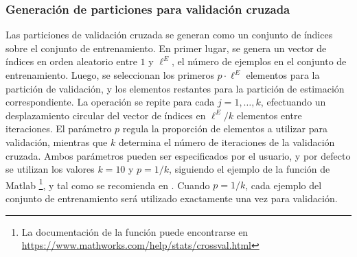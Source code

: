 %
%
\subsubsection{Generación de particiones para validación cruzada}
%
Las particiones de validación cruzada se generan como un conjunto de
índices sobre el conjunto de entrenamiento.
En primer lugar, se genera un vector de índices en orden aleatorio
entre $1$ y $\ell^E$, el número de ejemplos en el conjunto de
entrenamiento.
Luego, se seleccionan los primeros $p\cdot\ell^E$ elementos para la
partición de validación, y los elementos restantes para la partición
de estimación correspondiente.
La operación se repite para cada $j=1,\ldots,k$, efectuando un
desplazamiento circular del vector de índices en $\ell^E/k$ elementos
entre iteraciones.
El parámetro $p$ regula la proporción de elementos a utilizar para
validación, mientras que $k$ determina el número de iteraciones de la
validación cruzada.
Ambos parámetros pueden ser especificados por el usuario, y por
defecto se utilizan los valores $k=10$ y $p=1/k$, siguiendo el ejemplo
de la función de Matlab \footnote{%
  La documentación de la función  puede encontrarse en
  \url{https://www.mathworks.com/help/stats/crossval.html}
}, y tal como se recomienda en \cite{hastie}.
Cuando $p=1/k$, cada ejemplo del conjunto de entrenamiento será
utilizado exactamente una vez para validación.
